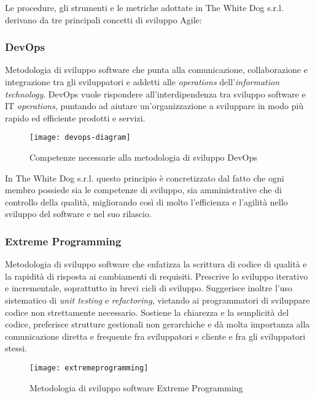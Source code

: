 Le procedure, gli strumenti e le metriche adottate in The White Dog s.r.l. derivano da tre principali concetti di sviluppo Agile:

\subsubsection{DevOps}

Metodologia di sviluppo software che punta alla comunicazione, collaborazione e integrazione tra gli sviluppatori e addetti alle \textit{operations} dell'\textit{information technology}. DevOps vuole rispondere all'interdipendenza tra sviluppo software e IT \textit{operations}, puntando ad aiutare un'organizzazione a sviluppare in modo più rapido ed efficiente prodotti e servizi.

\label{DevOps}
\begin{figure}[ht]
	\begin{center}
		\texttt{[image: devops-diagram]}
		\caption{Competenze necessarie alla metodologia di sviluppo DevOps}
	\end{center}
\end{figure}
\FloatBarrier

In The White Dog s.r.l. questo principio è concretizzato dal fatto che ogni membro possiede sia le competenze di sviluppo, sia amministrative che di controllo della qualità, migliorando così di molto l'efficienza e l'agilità nello sviluppo del software e nel suo rilascio.

\subsubsection{Extreme Programming}

Metodologia di sviluppo software che enfatizza la scrittura di codice di qualità e la rapidità di risposta ai cambiamenti di requisiti. Prescrive lo sviluppo iterativo e incrementale, soprattutto in brevi cicli di sviluppo. Suggerisce inoltre l'uso sistematico di \textit{unit testing} e \textit{refactoring}, vietando ai programmatori di sviluppare codice non strettamente necessario. Sostiene la chiarezza e la semplicità del codice, preferisce strutture gestionali non gerarchiche e dà molta importanza  alla comunicazione diretta e frequente fra sviluppatori e cliente e fra gli sviluppatori stessi. 

\label{Extreme Programming}
\begin{figure}[ht]
	\begin{center}
		\texttt{[image: extremeprogramming]}
		\caption{Metodologia di sviluppo software Extreme Programming}
	\end{center}
\end{figure}
\FloatBarrier

